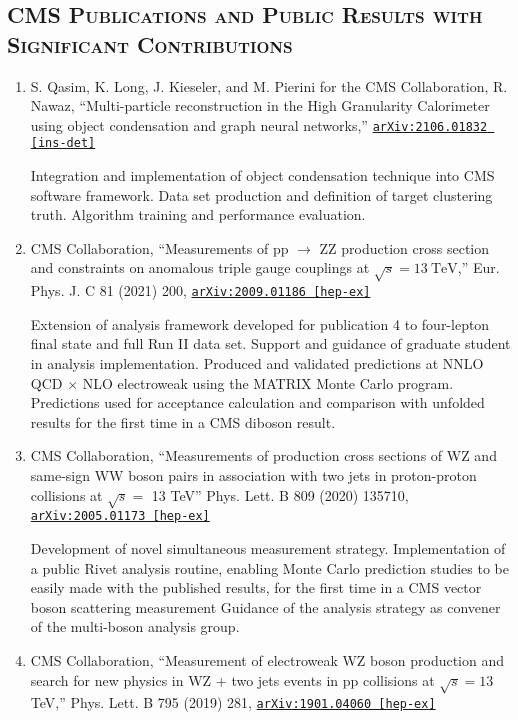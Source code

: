\documentclass[10pt]{res} %
\begin{document}
\begin{resume}

\section{\textsc{CMS Publications and Public Results with Significant Contributions}}
\begin{enumerate}
  \item S. Qasim, K. Long, J. Kieseler, and M. Pierini for the CMS Collaboration, R. Nawaz, ``Multi-particle reconstruction in the High Granularity Calorimeter using object condensation and graph neural networks,'' \href{https://arxiv.org/abs/2106.01832}{\texttt{arXiv:2106.01832 [ins-det]}} 
     
    Integration and implementation of object condensation technique into CMS software framework. 
    Data set production and definition of target clustering truth. Algorithm training and performance evaluation.
  \item CMS Collaboration, ``Measurements of pp $\rightarrow$ ZZ production cross section and constraints on anomalous triple gauge couplings at $\sqrt{s} = 13~\mathrm{TeV}$,'' Eur. Phys. J. C 81 (2021) 200, \href{https://arxiv.org/abs/2009.01186}{\texttt{arXiv:2009.01186 [hep-ex]}}

    Extension of analysis framework developed for publication 4 to four-lepton final state and full Run II data set.
    Support and guidance of graduate student in analysis implementation. 
    Produced and validated predictions at NNLO QCD $\times$ NLO electroweak using the MATRIX Monte Carlo program.
    Predictions used for acceptance calculation and comparison with unfolded results for the first time in a CMS diboson result. 
  \item CMS Collaboration, ``Measurements of production cross sections of WZ and same-sign WW boson pairs in association with two jets in proton-proton collisions at $\sqrt{s} =$ 13 TeV'' Phys. Lett. B 809 (2020) 135710, \href{https://arxiv.org/abs/2005.01173}{\texttt{arXiv:2005.01173 [hep-ex]}}

    Development of novel simultaneous measurement strategy. 
    Implementation of a public Rivet analysis routine, enabling Monte Carlo prediction studies to be easily made 
    with the published results, for the first time in a CMS vector boson scattering measurement
    Guidance of the analysis strategy as convener of the multi-boson analysis group.
  \item CMS Collaboration, ``Measurement of electroweak WZ boson production and search for new physics in WZ $+$ two jets events in pp collisions at $\sqrt{s}=13$\,TeV,'' Phys. Lett. B 795 (2019) 281, \href{https://arxiv.org/abs/1901.04060} {\texttt{arXiv:1901.04060 [hep-ex]}}


\end{enumerate}
\end{resume}
\end{document}

